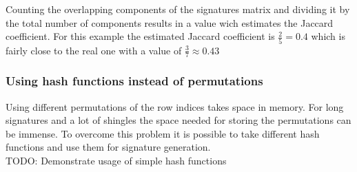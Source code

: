 Counting the overlapping components of the signatures matrix and dividing it by the total number of components results in a value wich estimates the Jaccard coefficient. For this example the estimated Jaccard coefficient is $ \frac{2}{5} = 0.4 $ which is fairly close to the real one with a value of $ \frac{3}{7} \approx 0.43 $

\subsubsection{Using hash functions instead of permutations}

Using different permutations of the row indices takes space in memory. For long signatures and a lot of shingles the space needed for storing the permutations can be immense. To overcome this problem it is possible to take different hash functions and use them for signature generation. \\

TODO: Demonstrate usage of simple hash functions


